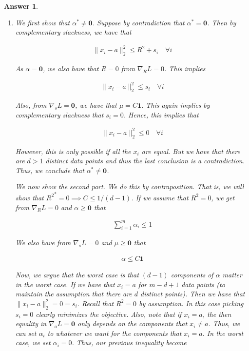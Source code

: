\documentclass[12pt]{article}
\theoremstyle{colon}
\newtheorem*{answer}{Answer}
\begin{document}
\begin{answer}
\begin{enumerate}[label=\alph*)]
    \item We first show that $\alpha^* \neq \bm{0}$. Suppose by contradiction that $\alpha^* = \bm{0}$. Then by complementary slackness, we have that

      \begin{gather*}
        \lVert x_i - a \rVert_2^2 \leq R^2 + s_i \quad \forall i
      \end{gather*}

      As $\alpha = \bm{0}$, we also have that $R = 0$ from $\nabla_R L = 0$. This implies

      \begin{gather*}
        \lVert x_i - a \rVert_2^2 \leq s_i \quad \forall i
      \end{gather*}

      Also, from $\nabla_s L = \bm{0}$, we have that $\mu = C \bm{1}$. This again implies by complementary slackness that $s_i = 0$. Hence, this implies that

      \begin{gather*}
        \lVert x_i - a \rVert_2^2 \leq 0 \quad \forall i
      \end{gather*}

      However, this is only possible if all the $x_i$ are equal. But we have that there are $d > 1$ distinct data points and thus the last conclusion is a contradiction. Thus, we conclude that $\alpha^* \neq \bm{0}$.

      We now show the second part. We do this by contraposition. That is, we will show that ${R^2}^* = 0 \implies C \leq 1/(d-1)$. If we assume that $R^2 = 0$, we get from $\nabla_R L = 0$ and $\alpha \geq \bm{0}$ that

      \begin{gather*}
        \sum_{i=1}^m \alpha_i \leq 1
      \end{gather*}

      We also have from $\nabla_s L = 0$ and $\mu \geq \bm{0}$ that

      \begin{gather*}
        \alpha \leq C \bm{1}
      \end{gather*}

      Now, we argue that the worst case is that $(d-1)$ components of $\alpha$ matter in the worst case. If we have that $x_i = a$ for $m-d+1$ data points (to maintain the assumption that there are $d$ distinct points). Then we have that $\lVert x_i - a \rVert_2^2 = 0 = s_i$. Recall that $R^2 = 0$ by assumption. In this case picking $s_i = 0$ clearly minimizes the objective. Also, note that if $x_i = a$, the then equality in $\nabla_a L = \bm{0}$ only depends on the components that $x_i \neq a$. Thus, we can set $\alpha_i$ to whatever we want for the components that $x_i = a$. In the worst case, we set $\alpha_i = 0$. Thus, our previous inequality become


\end{enumerate}
\end{answer}
\end{document}
